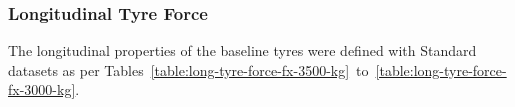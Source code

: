
\subsubsection{Longitudinal Tyre Force}\label{section:longitudinal-tyre-force-trucksim-datasets}

The longitudinal properties of the baseline tyres were defined with Standard \trucksim{} datasets as per Tables~\ref{table:long-tyre-force-fx-3500-kg}~to~\ref{table:long-tyre-force-fx-3000-kg}.

\begin{table}[H]
	\centering\footnotesize
	\begin{threeparttable}


\end{threeparttable}
\end{table}
